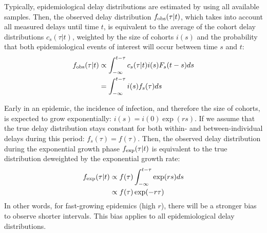 \documentclass[12pt]{article}
\begin{document}
Typically, epidemiological delay distributions are estimated by using all available samples.
Then, the observed delay distribution $f_{\tiny\textrm{obs}}(\tau|t)$, which takes into account all measured delays until time $t$, is equivalent to the average of the cohort delay distributions $c_s(\tau|t)$, weighted by the size of cohorts $i(s)$ and the probability that both epidemiological events of interest will occur between time $s$ and $t$:
\begin{equation}
\begin{aligned}
f_{\tiny\textrm{obs}}(\tau|t) &\propto \int_{-\infty}^{t-\tau} c_s(\tau|t) i(s) F_s(t-s) ds\\
&= \int_{-\infty}^{t-\tau} i(s) f_s(\tau) ds
\end{aligned}
\end{equation}

Early in an epidemic, the incidence of infection, and therefore the size of cohorts, is expected to grow exponentially: $i(s) = i(0) \exp(rs)$.
If we assume that the true delay distribution stays constant for both within- and between-individual delays during this period: $f_s(\tau) = f(\tau)$.
Then, the observed delay distribution during the exponential growth phase $f_{\tiny\textrm{exp}}(\tau|t)$ is equivalent to the true distribution deweighted by the exponential growth rate:
\begin{equation}
\begin{aligned}
f_{\tiny\textrm{exp}}(\tau|t) &\propto f(\tau) \int_{-\infty}^{t-\tau} \exp(rs) ds\\
&\propto f(\tau) \exp(-r\tau) \\
\end{aligned}
\end{equation}
In other words, for fast-growing epidemics (high $r$), there will be a stronger bias to observe shorter intervals.
This bias applies to all epidemiological delay distributions.
\end{document}
